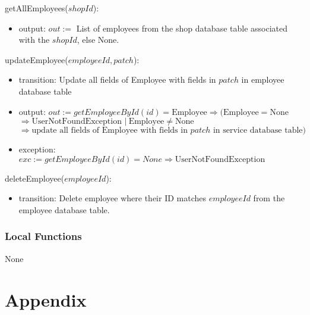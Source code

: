 \documentclass[12pt, titlepage]{article}
\begin{document}
\noindent getAllEmployees($shopId$):
\begin{itemize}
	\item output: $out :=$ List of employees from the shop database table associated with the $shopId$, else
	      None.
\end{itemize}

\noindent updateEmployee($employeeId, patch$):
\begin{itemize}
	\item transition: Update all fields of Employee with fields in $patch$ in employee database table
	\item output: $out := getEmployeeById(id) = \text{Employee} \Rightarrow (\text{Employee} = \text{None} $
		      \\ $\Rightarrow \text{UserNotFoundException } |\ \text{Employee} \neq \text{None}$ \\ $\Rightarrow
		      \text{update all fields of Employee with fields in } patch \text{ in service database table})$
	\item exception: $exc := getEmployeeById(id) = None \Rightarrow \text{UserNotFoundException}$
\end{itemize}

\noindent deleteEmployee($employeeId$):
\begin{itemize}
	\item transition: Delete employee where their ID matches $employeeId$ from the employee database table.
\end{itemize}

\subsubsection{Local Functions}

None

\newpage




\newpage

\section{Appendix}

\end{document}
